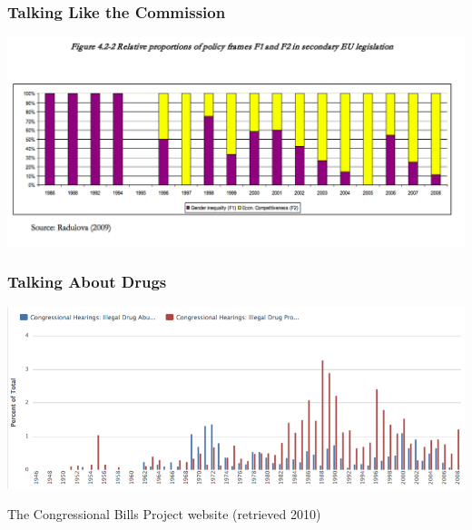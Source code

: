 \documentclass[11pt,compress,professionalfonts]{beamer}
\begin{document}
\begin{frame}[t]\frametitle{Talking Like the Commission}

\centerline{\includegraphics[scale=.75]{pictures/radulova-frames2}}


\end{frame}
\begin{frame}[t]\frametitle{Talking About Drugs}

\centerline{\includegraphics[scale=.75]{pictures/drugs}}

The Congressional Bills Project website (retrieved 2010)
%
%
%

%
%
%
%
%
%


\end{frame}
\end{document}
